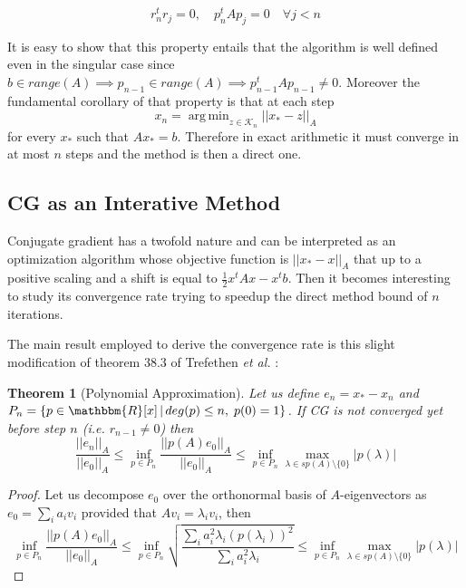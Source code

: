 \documentclass[12pt]{article}
\DeclareMathOperator*{\argmin}{arg\,min}
\newcommand{\R}{\mathbbm{R}}
\newcommand{\1}{\mathbbm{1}}
\newtheorem{theorem}{Theorem}
\begin{document}
\begin{equation*}
  r_n^t r_j = 0, \quad p_n^t A p_j = 0 \quad \forall j < n
\end{equation*}
\hspace{0.5cm}

It is easy to show that this property entails that the algorithm is well defined even in the singular case since $ b \in range(A) \implies p_{n-1} \in range(A) \implies p_{n-1}^t A p_{n-1} \neq 0$. Moreover the fundamental corollary of that property is that  at each step
$$x_n = \argmin_{z \in \mathcal{K}_n} || x_* - z ||_A $$
for every $x_*$ such that $Ax_* = b$. Therefore in exact arithmetic it must converge in at most $n$ steps and the method is then a direct one.

\subsection{CG as an Interative Method}
Conjugate gradient has a twofold nature and can be interpreted as an optimization algorithm whose objective function is $ || x_* - x ||_A $ that up to a positive scaling and a shift is equal to $ \frac{1}{2}x^t A x - x^t b$. Then it becomes interesting to study its convergence rate trying to speedup the direct method bound of $n$ iterations.

The main result employed to derive the convergence rate is this slight modification of theorem 38.3 of Trefethen {\em et al.} \cite{trefethen97}:

\begin{theorem}[Polynomial Approximation]\label{polap}
  Let us define $e_n = x_* - x_n$ and $P_n = \left\{p \in \R[x]\, |\, deg(p) \leq n, \; p(0) = 1 \right\}$. If CG is not converged yet before step $n$ (i.e. $r_{n-1} \neq 0$) then 
$$ \frac{||e_n||_A}{||e_0||_A} \leq \inf_{p \in P_n}\frac{||p(A) e_0||_A}{||e_0||_A} \leq \inf_{p \in P_n} \max_{\lambda \in sp(A)\setminus\{0\}}|p(\lambda)|
$$
\end{theorem}
\begin{proof}
  Let us decompose $e_0$ over the orthonormal basis of $A$-eigenvectors as\\ $e_0 = \sum_i a_i v_i$ provided that $A v_i = \lambda_i v_i$, then
$$\inf_{p \in P_n}\frac{||p(A) e_0||_A}{||e_0||_A} \leq \inf_{p \in P_n}\sqrt{\frac{\sum_i a_i^2 \lambda_i \left(p(\lambda_i)\right)^2}{\sum_i a_i^2 \lambda_i}}\leq \inf_{p \in P_n} \max_{\lambda \in sp(A)\setminus\{0\}}|p(\lambda)|$$

\end{proof}
\end{document}
